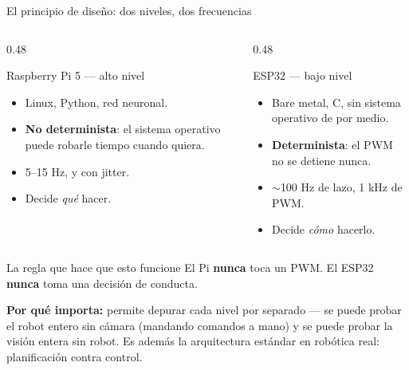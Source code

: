 \documentclass[aspectratio=169,10pt]{beamer}
\begin{document}
\begin{frame}{El principio de diseño: dos niveles, dos frecuencias}
  \begin{columns}[T,onlytextwidth]
    \begin{column}{0.48\textwidth}
      \begin{block}{\textcolor{azul}{Raspberry Pi 5} --- alto nivel}
        \small
        \begin{itemize}
          \item Linux, Python, red neuronal.
          \item \textbf{No determinista}: el sistema operativo puede robarle
                tiempo cuando quiera.
          \item 5--15 Hz, y con jitter.
          \item Decide \emph{qué} hacer.
        \end{itemize}
      \end{block}
    \end{column}
    \begin{column}{0.48\textwidth}
      \begin{block}{\textcolor{naranja}{ESP32} --- bajo nivel}
        \small
        \begin{itemize}
          \item Bare metal, C, sin sistema operativo de por medio.
          \item \textbf{Determinista}: el PWM no se detiene nunca.
          \item $\sim$100 Hz de lazo, 1 kHz de PWM.
          \item Decide \emph{cómo} hacerlo.
        \end{itemize}
      \end{block}
    \end{column}
  \end{columns}

  \vspace{0.8em}
  \begin{alertblock}{La regla que hace que esto funcione}
    \centering
    El Pi \textbf{nunca} toca un PWM. \quad El ESP32 \textbf{nunca} toma una
    decisión de conducta.
  \end{alertblock}

  \vspace{0.5em}
  \small
  \textbf{Por qué importa:} permite depurar cada nivel por separado --- se puede
  probar el robot entero sin cámara (mandando comandos a mano) y se puede probar
  la visión entera sin robot. Es además la arquitectura estándar en robótica
  real: planificación contra control.
\end{frame}
\end{document}
